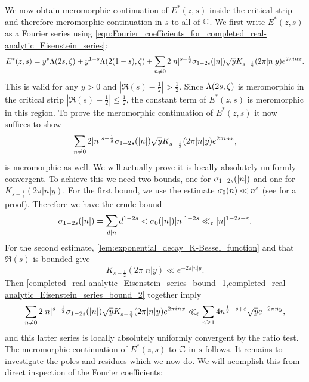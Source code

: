       We now obtain meromorphic continuation of $E^{\ast}(z,s)$ inside the critical strip and therefore meromorphic continuation in $s$ to all of $\mathbb{C}$. We first write $E^{\ast}(z,s)$ as a Fourier series using \cref{equ:Fourier_coefficients_for_completed_real-analytic_Eisenstein_series}:
      \[
        E^{\ast}(z,s) = y^{s}\Lambda(2s,\zeta)+y^{1-s}\Lambda(2(1-s),\zeta)+\sum_{n \neq 0}2|n|^{s-\frac{1}{2}}\sigma_{1-2s}(|n|)\sqrt{y}K_{s-\frac{1}{2}}(2\pi|n|y)e^{2\pi inx}.
      \]
      This is valid for any $y > 0$ and $|\Re(s)-\frac{1}{2}| > \frac{1}{2}$. Since $\Lambda(2s,\zeta)$ is meromorphic in the critical strip $|\Re(s)-\frac{1}{2}| \le \frac{1}{2}$, the constant term of $E^{\ast}(z,s)$ is meromorphic in this region. To prove the meromorphic continuation of $E^{\ast}(z,s)$ it now suffices to show
      \[
        \sum_{n \neq 0}2|n|^{s-\frac{1}{2}}\sigma_{1-2s}(|n|)\sqrt{y}K_{s-\frac{1}{2}}(2\pi|n|y)e^{2\pi inx},
      \]
      is meromorphic as well. We will actually prove it is locally absolutely uniformly convergent. To achieve this we need two bounds, one for $\sigma_{1-2s}(|n|)$ and one for $K_{s-\frac{1}{2}}(2\pi|n|y)$. For the first bound, we use the estimate $\sigma_{0}(n) \ll n^{\varepsilon}$ (see \cite{montgomery2006multiplicative} for a proof). Therefore we have the crude bound
      \begin{equation}\label{completed_real-analytic_Eisenstein_series_bound_1}
        \sigma_{1-2s}(|n|) = \sum_{d \mid n}d^{1-2s} < \sigma_{0}(|n|)|n|^{1-2s} \ll_{\varepsilon}|n|^{1-2s+\varepsilon}.
      \end{equation}
      For the second estimate, \cref{lem:exponential_decay_K-Bessel_function} and that $\Re(s)$ is bounded give
      \begin{equation}\label{completed_real-analytic_Eisenstein_series_bound_2}
        K_{s-\frac{1}{2}}(2\pi|n|y) \ll e^{-2\pi|n|y}.
      \end{equation}
      Then \cref{completed_real-analytic_Eisenstein_series_bound_1,completed_real-analytic_Eisenstein_series_bound_2} together imply
      \begin{equation}\label{equ:non-constant_Fourier_coefficient_bound_non-holomorphic_Eisenstein_series}
        \sum_{n \neq 0}2|n|^{s-\frac{1}{2}}\sigma_{1-2s}(|n|)\sqrt{y}K_{s-\frac{1}{2}}(2\pi|n|y)e^{2\pi inx} \ll_{\varepsilon} \sum_{n \ge 1}4n^{\frac{1}{2}-s+\varepsilon}\sqrt{y}e^{-2\pi ny},
      \end{equation}
      and this latter series is locally absolutely uniformly convergent by the ratio test. The meromorphic continuation of $E^{\ast}(z,s)$ to $\mathbb{C}$ in $s$ follows. It remains to investigate the poles and residues which we now do. We will acomplish this from direct inspection of the Fourier coefficients:

